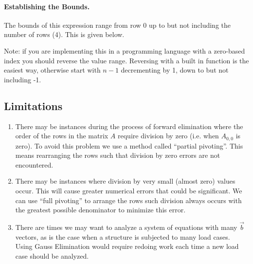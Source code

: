 \documentclass{../../KDHnotes}
\begin{document}
\paragraph{Establishing the Bounds.}
The bounds of this expression range from row 0 up to but not including the number of rows (4). This is given below.



Note: if you are implementing this in a programming language with a zero-based index you should reverse the value range. Reversing with a built in function is the easiest way, otherwise start with $n-1$ decrementing by 1, down to but not including -1.


\subsection{Limitations}
\begin{enumerate}
\item There may be instances during the process of forward elimination where the order of the rows in the matrix $A$ require division by zero (i.e. when $A_{0,0}$ is zero). To avoid this problem we use a method called ``partial pivoting''. This means rearranging the rows such that division by zero errors are not encountered.

\item There may be instances where division by very small (almost zero) values occur. This will cause greater numerical errors that could be significant. We can use ``full pivoting'' to arrange the rows such division always occurs with the greatest possible denominator to minimize this error.

\item There are times we may want to analyze a system of equations with many $\vec{b}$ vectors, as is the case when a structure is subjected to many load cases. Using Gauss Elimination would require redoing work each time a new load case should be analyzed.
\end{enumerate}

\nocite{NumMethods}

\newpage



\end{document}
